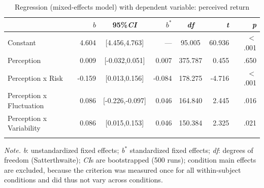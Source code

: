 \documentclass[a4paper,man, natbib,floatsintext]{apa6} %
\begin{document}
\begin{table}[H]
\begin{center}
\begin{threeparttable}
\caption{Regression (mixed-effects model) with dependent variable: perceived return \\\label{study1:mixed_effects_model}}
    \begin{tabular}{lrcrcrr}
    \toprule
     & $b$ & 95\%\textit{CI} & $b^*$ & \textit{df} & \textit{t} & \textit{p}\\
    \midrule
    Constant & 4.604 & [4.456,4.763] & --- & 95.005 & 60.936 & $<$ .001\\
    Perception & 0.009 & [-0.032,0.051] & 0.007 & 375.787 & 0.455 & .650\\
    Perception x Risk & -0.159 & [0.013,0.156] & -0.084 & 178.275 & -4.716 & $<$ .001\\
    Perception x Fluctuation & 0.086 & [-0.226,-0.097] & 0.046 & 164.840 & 2.445 & .016\\
    Perception x Variability & 0.086 & [0.015,0.153] & 0.046 & 150.384 & 2.325 & .021\\
    \bottomrule
    \addlinespace
    \end{tabular}
\begin{tablenotes}[para]
\normalsize{\textit{Note.} \textit{b}: unstandardized fixed effects; \textit{b}$^*$ standardized fixed effects; \textit{df}: degrees of freedom (Satterthwaite); \textit{CI}s are bootstrapped (500 runs); condition main effects are excluded, because the criterion was measured once for all within-subject conditions and did thus not vary across conditions.}
\end{tablenotes}
\end{threeparttable}
\end{center}
\end{table}
\end{document}
